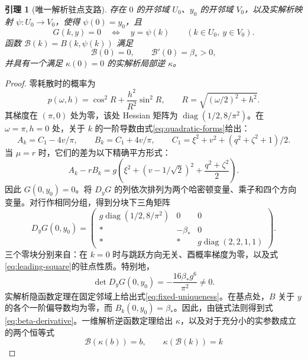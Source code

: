 \documentclass[UTF8,11pt,a4paper,fontset=fandol]{ctexart}
\newtheorem{lemma}[theorem]{引理}
\theoremstyle{definition}
\theoremstyle{remark}
\DeclareMathOperator{\diag}{diag}
\begin{document}
\begin{lemma}[唯一解析驻点支路]\label{lem:analytic-system}
存在 \(0\) 的开邻域 \(U_0\)、\(y_0\) 的开邻域 \(V_0\)，以及实解析映射 \(\psi:U_0\to V_0\)，使得 \(\psi(0)=y_0\)，且
\begin{equation}\label{eq:fixed-uniqueness}
 G(k,y)=0\quad\Longleftrightarrow\quad y=\psi(k)
 \qquad(k\in U_0,\ y\in V_0).
\end{equation}
函数 \(\mathcal B(k)=B(k,\psi(k))\) 满足
\begin{equation}\label{eq:beta-derivative}
 \mathcal B(0)=0,\qquad \mathcal B'(0)=\beta_*>0,
\end{equation}
并具有一个满足 \(\kappa(0)=0\) 的实解析局部逆 \(\kappa\)。
\end{lemma}
\begin{proof}
零耗散时的概率为
\[
 p(\omega,h)=\cos^2 R+\frac{h^2}{R^2}\sin^2 R,
 \qquad R=\sqrt{(\omega/2)^2+h^2}.
\]
其梯度在 \((\pi,0)\) 处为零，该处 Hessian 矩阵为
\(\diag(1/2,8/\pi^2)\)。在 \(\omega=\pi,h=0\) 处，关于 \(k\) 的一阶导数由式\eqref{eq:quadratic-forms}给出：
\[
 A_k=C_1-4v/\pi,\qquad B_k=C_1+4v/\pi,
 \qquad C_1=\xi^2+v^2+(q^2+\zeta^2+1)/2.
\]
当 \(\mu=r\) 时，它们的差为以下精确平方形式：
\begin{equation}\label{eq:leading-square}
 A_k-rB_k=g\left(\xi^2+(v-1/\sqrt2)^2+\frac{q^2+\zeta^2}{2}\right).
\end{equation}
因此 \(G(0,y_0)=0\)。将 \(D_yG\) 的列依次排列为两个哈密顿变量、乘子和四个方向变量。对行作相同分组，得到分块下三角矩阵
\begin{equation}\label{eq:Jacobian}
 D_yG(0,y_0)=
 \begin{pmatrix}
 g\diag(1/2,8/\pi^2)&0&0\\
 *&-\beta_*&0\\
 *&*&g\diag(2,2,1,1)
 \end{pmatrix}.
\end{equation}
三个零块分别来自：在 \(k=0\) 时与跳跃方向无关、酉概率梯度为零，以及式\eqref{eq:leading-square}的驻点性质。特别地，
\[
 \det D_yG(0,y_0)=-\frac{16\beta_*g^6}{\pi^2}\ne0.
\]
实解析隐函数定理在固定邻域上给出式\eqref{eq:fixed-uniqueness}。在基点处，\(B\) 关于 \(y\) 的各个一阶偏导数均为零，而 \(B_k(0,y_0)=\beta_*\)。因此，由链式法则得到式\eqref{eq:beta-derivative}。一维解析逆函数定理给出 \(\kappa\)，以及对于充分小的实参数成立的两个恒等式
\begin{equation}\label{eq:both-inverses}
 \mathcal B(\kappa(b))=b,\qquad \kappa(\mathcal B(k))=k
\end{equation}
\end{proof}
\end{document}
